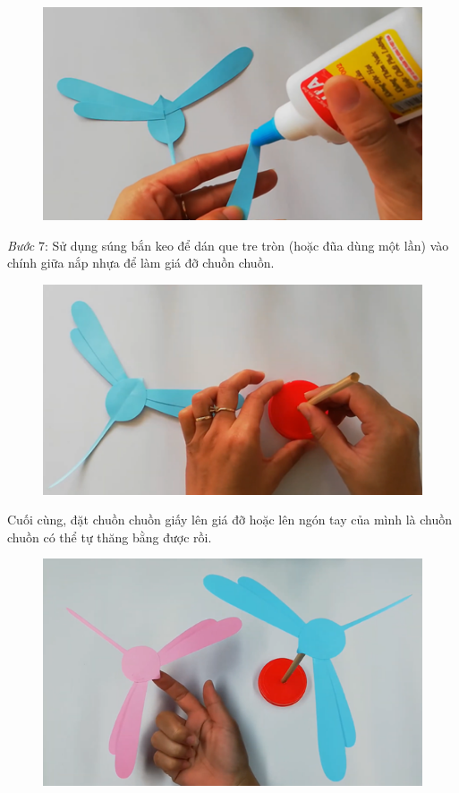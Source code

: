 \begin{multicols}{2}
\begin{figure}[H]
		\centering
		\captionsetup{labelformat= empty, justification=centering}
		\includegraphics[width= 1\linewidth]{73}
		\vspace*{-10pt}
	\end{figure}
	\textit{Bước} $7$: Sử dụng súng bắn keo để dán que tre tròn (hoặc đũa dùng một lần) vào chính giữa nắp nhựa để làm giá đỡ chuồn chuồn.
	\begin{figure}[H]
		\vspace*{-5pt}
		\centering
		\captionsetup{labelformat= empty, justification=centering}
		\includegraphics[width= 1\linewidth]{74}
		\vspace*{-10pt}
	\end{figure}
	Cuối cùng, đặt chuồn chuồn giấy lên giá đỡ hoặc lên ngón tay của mình là chuồn chuồn có thể tự thăng bằng được rồi.
	\begin{figure}[H]
		\vspace*{-5pt}
		\centering
		\captionsetup{labelformat= empty, justification=centering}
		\includegraphics[width= 1\linewidth]{75}

\end{figure}
\end{multicols}
